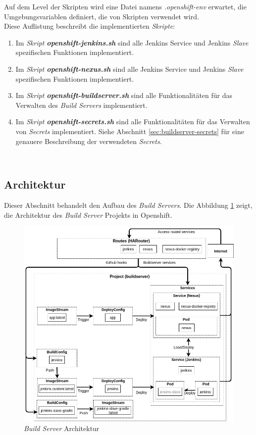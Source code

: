 Auf dem Level der Skripten wird eine Datei namens \emph{.openshift-env} erwartet, die Umgebungsvariablen definiert, die von Skripten verwendet wird.\\

Diese Auflistung beschreibt die implementierten \emph{Skripte}:
\begin{enumerate}
	\item Im \emph{Skript} \textbf{\emph{openshift-jenkins.sh}} sind alle Jenkins Service und Jenkins \emph{Slave} spezifischen Funktionen implementiert.
	\item Im \emph{Skript} \textbf{\emph{openshift-nexus.sh}} sind alle Jenkins Service und Jenkins \emph{Slave} spezifischen Funktionen implementiert.
	\item Im \emph{Skript} \textbf{\emph{openshift-buildserver.sh}} sind alle Funktionalitäten für das Verwalten des \emph{Build Servers} implementiert.
	\item Im \emph{Skript} \textbf{\emph{openshift-secrets.sh}} sind alle Funktionalitäten für das Verwalten von \emph{Secrets} implementiert. Siehe Abschnitt \ref{sec:buildserver-secrets} für eine genauere Beschreibung der verwendeten \emph{Secrets}.
\end{enumerate}

\ \subsection{Architektur}
Dieser Abschnitt behandelt den Aufbau des \emph{Build Servers}. Die Abbildung \ref{fig:architecture} zeigt, die Architektur des \emph{Build Server} Projekts in Openshift.
\begin{figure}[H]
	\centering
	\includegraphics[scale=0.6]{logos/architecture-diagram-buildserver.jpg}
	\caption{\emph{Build Server} Architektur}
	\label{fig:architecture}
\end{figure}
\ \newpage
